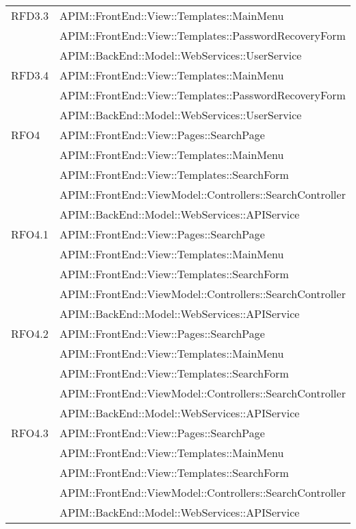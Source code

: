 \begin{longtable}{ p{4cm} | p{12cm} }
		    \hline RFD3.3
		    & APIM::FrontEnd::View::Templates::MainMenu \\
		    & APIM::FrontEnd::View::Templates::PasswordRecoveryForm \\  
		    & APIM::BackEnd::Model::WebServices::UserService \\
		    
		    \hline RFD3.4
		    & APIM::FrontEnd::View::Templates::MainMenu \\
		    & APIM::FrontEnd::View::Templates::PasswordRecoveryForm \\  
		    & APIM::BackEnd::Model::WebServices::UserService \\
		    
		    
		    \hline RFO4
		    & APIM::FrontEnd::View::Pages::SearchPage \\
		    & APIM::FrontEnd::View::Templates::MainMenu \\
		    & APIM::FrontEnd::View::Templates::SearchForm \\
		    & APIM::FrontEnd::ViewModel::Controllers::SearchController \\
		    & APIM::BackEnd::Model::WebServices::APIService \\  
		    
		    \hline RFO4.1
		    & APIM::FrontEnd::View::Pages::SearchPage \\
		    & APIM::FrontEnd::View::Templates::MainMenu \\
		    & APIM::FrontEnd::View::Templates::SearchForm \\
		    & APIM::FrontEnd::ViewModel::Controllers::SearchController \\
		    & APIM::BackEnd::Model::WebServices::APIService \\  
		    
		    \hline RFO4.2
		    & APIM::FrontEnd::View::Pages::SearchPage \\
		    & APIM::FrontEnd::View::Templates::MainMenu \\
		    & APIM::FrontEnd::View::Templates::SearchForm \\
		    & APIM::FrontEnd::ViewModel::Controllers::SearchController \\
		    & APIM::BackEnd::Model::WebServices::APIService \\  
		    
		    \hline RFO4.3
		    & APIM::FrontEnd::View::Pages::SearchPage \\
		    & APIM::FrontEnd::View::Templates::MainMenu \\
		    & APIM::FrontEnd::View::Templates::SearchForm \\
		    & APIM::FrontEnd::ViewModel::Controllers::SearchController \\
		    & APIM::BackEnd::Model::WebServices::APIService \\  
		    

\end{longtable}
